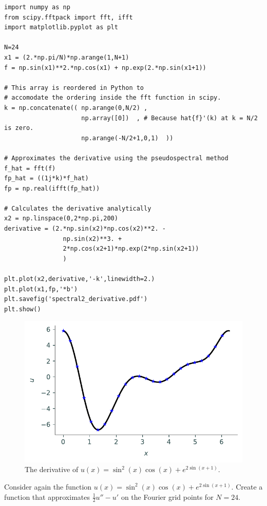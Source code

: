 \begin{lstlisting}
import numpy as np
from scipy.fftpack import fft, ifft
import matplotlib.pyplot as plt

N=24
x1 = (2.*np.pi/N)*np.arange(1,N+1)
f = np.sin(x1)**2.*np.cos(x1) + np.exp(2.*np.sin(x1+1))

# This array is reordered in Python to
# accomodate the ordering inside the fft function in scipy.
k = np.concatenate(( np.arange(0,N/2) ,
					 np.array([0])	, # Because hat{f}'(k) at k = N/2 is zero.
					 np.arange(-N/2+1,0,1)	))

# Approximates the derivative using the pseudospectral method
f_hat = fft(f)
fp_hat = ((1j*k)*f_hat)
fp = np.real(ifft(fp_hat))

# Calculates the derivative analytically
x2 = np.linspace(0,2*np.pi,200)
derivative = (2.*np.sin(x2)*np.cos(x2)**2. - 
				np.sin(x2)**3. + 
				2*np.cos(x2+1)*np.exp(2*np.sin(x2+1))
				)

plt.plot(x2,derivative,'-k',linewidth=2.)
plt.plot(x1,fp,'*b')
plt.savefig('spectral2_derivative.pdf')
plt.show()
\end{lstlisting}

\begin{figure}[H]
\centering
\includegraphics[width=\textwidth]{figures/spectral2_derivative_example.pdf}
\caption{The derivative of $u(x) = \sin^2 (x) \cos(x) +e^{2\sin(x+1)}$.}
\label{fig:spectral:spectral2_derivative}
\end{figure}

\begin{problem}
Consider again the function $u(x) = \sin^2 (x) \cos(x) +e^{2\sin(x+1)}$.
Create a function that approximates $\frac{1}{2}u''-u'$ on the Fourier grid points for $N=24$.	
\end{problem}

